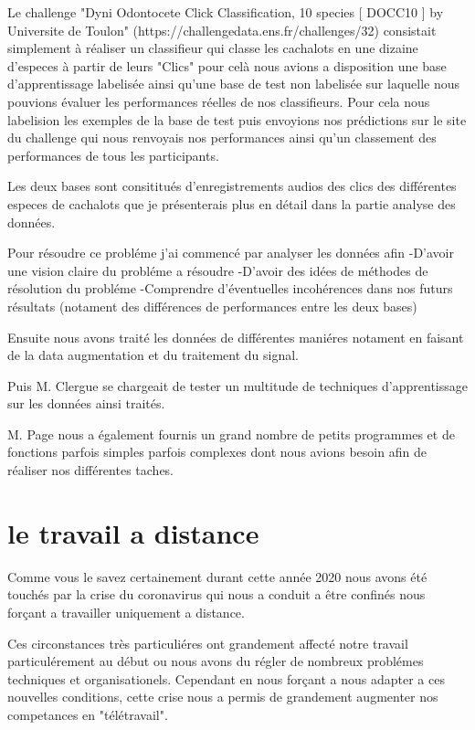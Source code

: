 Le challenge "Dyni Odontocete Click Classification, 10 species [ DOCC10 ]
by Universite de Toulon" (https://challengedata.ens.fr/challenges/32) consistait simplement à réaliser un classifieur qui classe les cachalots en une dizaine d'especes à partir de leurs "Clics" pour celà nous avions a disposition une base d'apprentissage labelisée ainsi qu'une base de test non labelisée sur laquelle nous pouvions évaluer les performances réelles de nos classifieurs. Pour cela nous labelision les exemples de la base de test puis envoyions nos prédictions sur le site du challenge qui nous renvoyais nos performances ainsi qu'un classement des performances de tous les participants.

Les deux bases sont consititués d'enregistrements audios des clics des différentes especes de cachalots que je présenterais plus en détail dans la partie analyse des données.

Pour résoudre ce probléme j'ai commencé par analyser les données afin
-D'avoir une vision claire du probléme a résoudre
-D'avoir des idées de méthodes de résolution du probléme
-Comprendre d'éventuelles incohérences dans nos futurs résultats (notament des différences de performances entre les deux bases)


Ensuite nous avons traité les données de différentes maniéres notament en faisant de la data augmentation et du traitement du signal.

Puis M. Clergue se chargeait de tester un multitude de techniques d'apprentissage sur les données ainsi traités.

M. Page nous a également fournis un grand nombre de petits programmes et de fonctions parfois simples parfois complexes dont nous avions besoin afin de réaliser nos différentes taches.

%

\section{le travail a distance}

\label{letravailadistance}

Comme vous le savez certainement durant cette année 2020 nous avons été touchés par la crise du coronavirus qui nous a conduit a être confinés nous forçant a travailler uniquement a distance.

Ces circonstances très particuliéres ont grandement affecté notre travail particulérement au début ou nous avons du régler de nombreux problémes techniques et organisationels. Cependant en nous forçant a nous adapter a ces nouvelles conditions, cette crise nous a permis de grandement augmenter nos competances en "télétravail".

